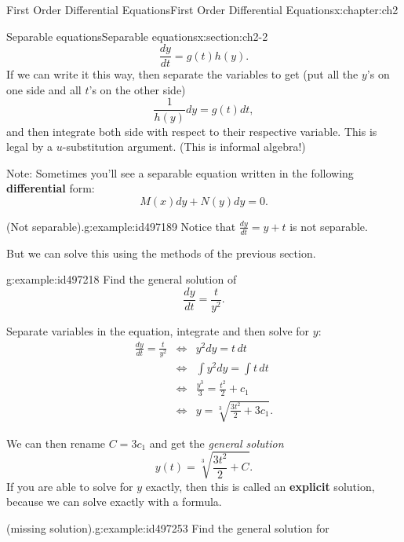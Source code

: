 \documentclass[oneside,10pt,]{book}
\newcommand{\terminology}[1]{\textbf{#1}}
\numberwithin{equation}{section}
\numberwithin{equation}{section}
\newcommand{\amp}{&}
\begin{document}
\begin{chapterptx}{First Order Differential Equations}{}{First Order Differential Equations}{}{}{x:chapter:ch2}
\begin{sectionptx}{Separable equations}{}{Separable equations}{}{}{x:section:ch2-2}
\begin{equation}
\frac{dy}{dt}=g(t)h(y).\label{x:men:sepeqn}
\end{equation}
If we can write it this way, then separate the variables to get (put all the \(y\)'s on one side and all \(t\)'s on the other side)%
\begin{equation*}
\frac{1}{h(y)}dy=g(t)dt,
\end{equation*}
and then integrate both side with respect to their respective variable. This is legal by a \(u\)-substitution argument. (This is informal algebra!)%
\par
Note: Sometimes you'll see a separable equation written in the following \terminology{differential} form:%
\begin{equation*}
M(x)dy+N(y)dy=0.
\end{equation*}
%
\begin{example}{(Not separable).}{g:example:id497189}%
Notice that \(\frac{dy}{dt}=y+t\) is not separable.%
\par
But we can solve this using the methods of the previous section.%
\end{example}
\begin{example}{}{g:example:id497218}%
Find the general solution of%
\begin{equation*}
\frac{dy}{dt}=\frac{t}{y^{2}}.
\end{equation*}
%
\par
Separate variables in the equation, integrate and then solve for \(y\):%
\begin{align*}
\frac{dy}{dt}=\frac{t}{y^{2}} \amp \iff \amp y^{2}dy=t\,dt\\
\amp \iff \amp \int y^{2}dy=\int t\,dt\\
\amp \iff \amp \frac{y^{3}}{3}=\frac{t^{2}}{2}+c_{1}\\
\amp \iff \amp y=\sqrt[3]{\frac{3t^{2}}{2}+3c_{1}}.
\end{align*}
%
\par
We can then rename \(C=3c_{1}\) and get the \emph{general solution}%
\begin{equation*}
y(t)=\sqrt[3]{\frac{3t^{2}}{2}+C}.
\end{equation*}
If you are able to solve for \(y\) exactly, then this is called an \terminology{explicit} solution, because we can solve exactly with a formula.%
\end{example}
\begin{example}{(missing solution).}{g:example:id497253}%
Find the general solution for%
\begin{equation*}

\end{equation*}
\end{example}
\end{sectionptx}
\end{chapterptx}
\end{document}
